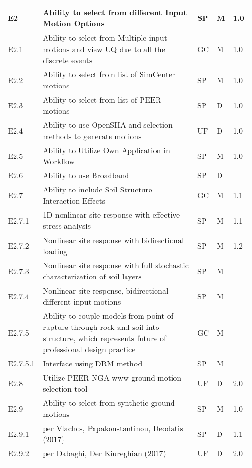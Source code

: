 \begin{longtable}{| p{} | p{} | p{} | p{} |  p{} |}
      E2 & \textbf{Ability to select from different Input Motion Options} & SP & M & 1.0  \\ \hline
      E2.1 & Ability to select from Multiple input motions and view UQ due to all the discrete events & GC & M & 1.0  \\ \hline
      E2.2 & Ability to select from list of SimCenter motions & SP & M & 1.0 \\ \hline
      E2.3 & Ability to select from list of PEER motions & SP & D & 1.0 \\ \hline
      E2.4 & Ability to use OpenSHA and selection methods to generate motions & UF & D & 1.0 \\ \hline
      E2.5 & Ability to Utilize Own Application in Workflow & SP & M & 1.0 \\ \hline
      E2.6 & Ability to use Broadband & SP & D &  \\ \hline
      E2.7  & Ability to include Soil Structure Interaction Effects & GC & M & 1.1 \\  \hline
      E2.7.1  & 1D nonlinear site response with effective stress analysis & SP & M & 1.1  \\ \hline
      E2.7.2  & Nonlinear site response with bidirectional loading & SP & M & 1.2 \\  \hline
      E2.7.3  & Nonlinear site response with full stochastic characterization of soil layers & SP & M &  \\ \hline
      E2.7.4 & Nonlinear site response, bidirectional different input motions  & SP & M &  \\  \hline
      E2.7.5 & Ability to couple models from point of rupture through rock and soil into structure, which represents future of professional design practice & GC & M &  \\  \hline
      E2.7.5.1 & Interface using DRM method  & SP  & M &  \\  \hline
      E2.8 & Utilize PEER NGA www ground motion selection tool  & UF & D & 2.0 \\ \hline
      E2.9 & Ability to select from synthetic ground motions & SP & M & 1.0  \\
      E2.9.1 & per Vlachos, Papakonstantinou, Deodatis (2017) & SP & D & 1.1  \\ 
      E2.9.2 & per Dabaghi, Der Kiureghian (2017) & UF & D & 2.0 \\  \hhline{=====}
      

\end{longtable}
